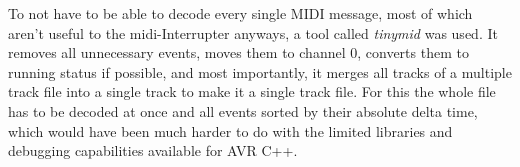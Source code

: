 To not have to be able to decode every single MIDI message, most of which aren't useful to the \gls{midi}-Interrupter anyways, a tool called \emph{tinymid} was used. It removes all unnecessary events, moves them to channel 0, converts them to running status if possible, and most importantly, it merges all tracks of a multiple track file into a single track to make it a single track file. For this the whole file has to be decoded at once and all events sorted by their absolute delta time, which would have been much harder to do with the limited libraries and debugging capabilities available for AVR C++.